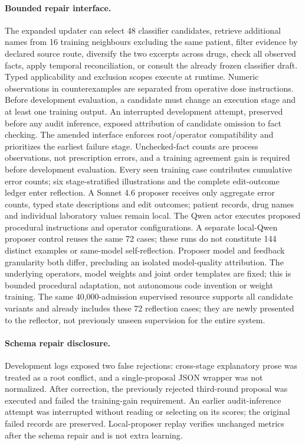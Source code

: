 \paragraph{Bounded repair interface.} The expanded updater can select 48 classifier candidates, retrieve additional names from 16 training neighbours excluding the same patient, filter evidence by declared source route, diversify the two excerpts across drugs, check all observed facts, apply temporal reconciliation, or consult the already frozen classifier draft. Typed applicability and exclusion scopes execute at runtime. Numeric observations in counterexamples are separated from operative dose instructions. Before development evaluation, a candidate must change an execution stage and at least one training output. An interrupted development attempt, preserved before any audit inference, exposed attribution of candidate omission to fact checking. The amended interface enforces root/operator compatibility and prioritizes the earliest failure stage. Unchecked-fact counts are process observations, not prescription errors, and a training agreement gain is required before development evaluation. Every seen training case contributes cumulative error counts; six stage-stratified illustrations and the complete edit-outcome ledger enter reflection. A Sonnet 4.6 proposer receives only aggregate error counts, typed state descriptions and edit outcomes; patient records, drug names and individual laboratory values remain local. The Qwen actor executes proposed procedural instructions and operator configurations. A separate local-Qwen proposer control reuses the same 72 cases; these runs do not constitute 144 distinct examples or same-model self-reflection. Proposer model and feedback granularity both differ, precluding an isolated model-quality attribution. The underlying operators, model weights and joint order templates are fixed; this is bounded procedural adaptation, not autonomous code invention or weight training. The same 40,000-admission supervised resource supports all candidate variants and already includes these 72 reflection cases; they are newly presented to the reflector, not previously unseen supervision for the entire system.
\paragraph{Schema repair disclosure.} Development logs exposed two false rejections: cross-stage explanatory prose was treated as a root conflict, and a single-proposal JSON wrapper was not normalized. After correction, the previously rejected third-round proposal was executed and failed the training-gain requirement. An earlier audit-inference attempt was interrupted without reading or selecting on its scores; the original failed records are preserved. Local-proposer replay verifies unchanged metrics after the schema repair and is not extra learning.
